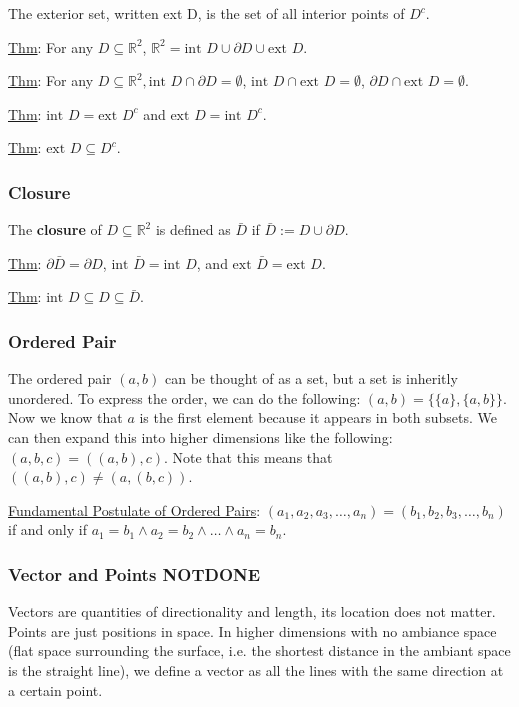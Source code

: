 \documentclass[11 pt, twoside]{article}
\begin{document}
The exterior set, written ext D, is the set of all interior points of $D^c$.

\par \underline{Thm}: For any $D \subseteq \mathbb{R}^2$, $\mathbb{R}^2 =
\text{int } D \cup \partial D \cup \text{ext } D$. 
\par \underline{Thm}: For any $D \subseteq \mathbb{R}^2, \text{int } D \cap
\partial D = \emptyset$, $\text{int } D \cap \text{ext } D = \emptyset$,
$\partial D \cap \text{ext } D = \emptyset$.
\par \underline{Thm}: $\text{int } D = \text{ext } D^c$ and $\text{ext } D =
\text{int } D^c$.
\par \underline{Thm}: $\text{ext } D \subseteq D^c$.

\subsubsection{Closure}
The \textbf{closure} of $D \subseteq \mathbb{R}^2$ is defined as $\bar{D}$ if
$\bar{D} := D \cup \partial D$.

\underline{Thm}: $\partial \bar{D} = \partial D$, $\text{int } \bar{D} =
\text{int } D$, and $\text{ext } \bar{D} = \text{ext } D$.
\par \underline{Thm}: $\text{int } D \subseteq D \subseteq \bar{D}$.

\subsubsection{Ordered Pair}
The ordered pair $(a, b)$ can be thought of as a set, but a set is inheritly
unordered. To express the order, we can do the following: $(a, b) = \{\{a\},
\{a, b\}\}$. Now we know that $a$ is the first element because it appears in
both subsets.
We can then expand this into higher dimensions like the following:
$(a, b, c) = ((a, b), c)$. Note that this means that $((a, b), c) \neq (a, (b,
c))$.

\underline{Fundamental Postulate of Ordered Pairs}:
$(a_1, a_2, a_3, \dots, a_n) = (b_1, b_2, b_3, \dots, b_n)$ if and only if $a_1
= b_1 \wedge a_2 = b_2 \wedge \dots \wedge a_n = b_n$.

\subsubsection{Vector and Points NOTDONE}
Vectors are quantities of directionality and length, its location does not
matter. Points are just positions in space. In higher dimensions with no
ambiance space (flat space surrounding the surface, i.e. the shortest distance
in the ambiant space is the straight line),  we define a vector as all
the lines with the same direction at a certain point.
\end{document}
